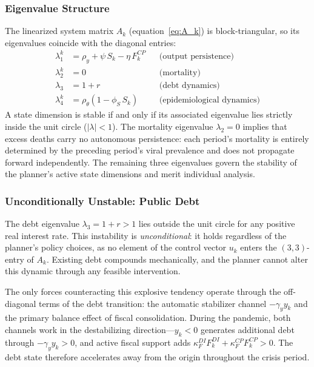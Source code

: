 \documentclass[12pt, a4paper]{article}
\begin{document}
\subsubsection{Eigenvalue Structure}

The linearized system matrix $A_k$ (equation~\ref{eq:A_k}) is block-triangular, so its
eigenvalues coincide with the diagonal entries:
%
\begin{align}
    \lambda_1^k &= \rho_y + \psi \, S_k - \eta \, F_k^{CP}
      & &\text{(output persistence)}
    \label{eq:lambda1} \\[4pt]
    \lambda_2^k &= 0
      & &\text{(mortality)}
    \label{eq:lambda2} \\[4pt]
    \lambda_3   &= 1 + r
      & &\text{(debt dynamics)}
    \label{eq:lambda3} \\[4pt]
    \lambda_4^k &= \rho_\theta (1 - \phi_S \, S_k)
      & &\text{(epidemiological dynamics)}
    \label{eq:lambda4}
\end{align}
%
A state dimension is stable if and only if its associated eigenvalue lies strictly
inside the unit circle ($|\lambda| < 1$). The mortality eigenvalue $\lambda_2 = 0$
implies that excess deaths carry no autonomous persistence: each period's mortality is
entirely determined by the preceding period's viral prevalence and does not propagate
forward independently. The remaining three eigenvalues govern the stability of the
planner's active state dimensions and merit individual analysis.

\subsubsection{Unconditionally Unstable: Public Debt}

The debt eigenvalue $\lambda_3 = 1 + r > 1$ lies outside the unit circle for any
positive real interest rate. This instability is \textit{unconditional}: it holds
regardless of the planner's policy choices, as no element of the control vector $u_k$
enters the $(3,3)$-entry of $A_k$. Existing debt compounds mechanically, and the
planner cannot alter this dynamic through any feasible intervention.

The only forces counteracting this explosive tendency operate through the off-diagonal
terms of the debt transition: the automatic stabilizer channel $-\gamma_y y_k$ and the
primary balance effect of fiscal consolidation. During the pandemic, both channels work
in the destabilizing direction---$y_k < 0$ generates additional debt through
$-\gamma_y y_k > 0$, and active fiscal support adds $\kappa_F^{DI} F_k^{DI} +
\kappa_F^{CP} F_k^{CP} > 0$. The debt state therefore accelerates away from the origin
throughout the crisis period.
\end{document}
